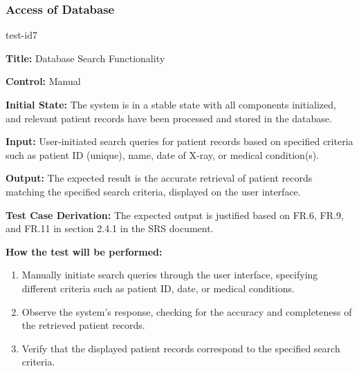 \documentclass[12pt, titlepage]{article}
\begin{document}
\subsubsection{Access of Database}
\begin{itemize}
    \begin{item}
        test-id7
        \begin{mdframed}[linewidth=0.5mm]
            \textbf{Title:} Database Search Functionality \par
            \textbf{Control:} Manual \par
            \textbf{Initial State:} The system is in a stable state with all components initialized, and relevant patient records have been processed and stored in the database. \par
            \textbf{Input:} User-initiated search queries for patient records based on specified criteria such as patient ID (unique), name, date of X-ray, or medical condition(s). \par
            \textbf{Output:} The expected result is the accurate retrieval of patient records matching the specified search criteria, displayed on the user interface. \par
            \textbf{Test Case Derivation:} The expected output is justified based on FR.6, FR.9, and FR.11 in section 2.4.1 in the SRS document. \par
            \textbf{How the test will be performed:}
            \begin{enumerate}[noitemsep]
                \item Manually initiate search queries through the user interface, specifying different criteria such as patient ID, date, or medical conditions.
                \item Observe the system's response, checking for the accuracy and completeness of the retrieved patient records.
                \item Verify that the displayed patient records correspond to the specified search criteria.
            \end{enumerate}
        \end{mdframed}
    \end{item}
\end{itemize}
\end{document}

